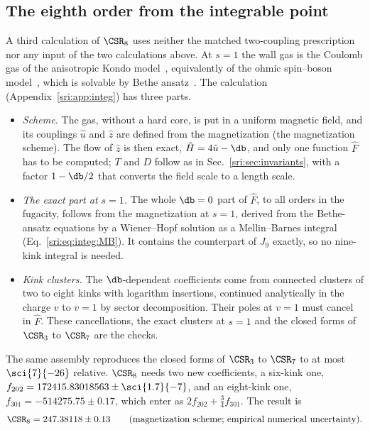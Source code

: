 \subsection{The eighth order from the integrable point}\label{sri:sec:integ}
A third calculation of $\CSR_8$ uses neither the matched two-coupling prescription nor any input of the two
calculations above. At $s=1$ the wall gas is the Coulomb gas of the anisotropic Kondo model~\cite{sri:Anderson:1969xx,sri:Anderson:1970kyb}, equivalently of the ohmic spin--boson model~\cite{sri:Leggett:1987zz}, which is solvable by Bethe
ansatz~\cite{sri:Andrei:1983,sri:Tsvelick:1983}. The calculation (Appendix~\ref{sri:app:integ}) has three parts.
\begin{itemize}
\item \emph{Scheme.} The gas, without a hard core, is put in a uniform magnetic field, and its couplings $\hat u$ and
 $\hat z$ are defined from the magnetization (the magnetization scheme). The flow of $\hat z$ is then exact,
 $\hat H=4\hat u-\db$, and only one function $\hat F$ has to be computed; $T$ and $D$ follow as in
 Sec.~\ref{sri:sec:invariants}, with a factor $1-\db/2$ that converts the field scale to a length scale.
\item \emph{The exact part at $s=1$.} The whole $\db=0$ part of $\hat F$, to all orders in the fugacity, follows from
 the magnetization at $s=1$, derived from the Bethe-ansatz equations by a Wiener--Hopf solution as a Mellin--Barnes
 integral (Eq.~\eqref{sri:eq:integ:MB}). It contains the counterpart of $J_9$ exactly, so no nine-kink integral is needed.
\item \emph{Kink clusters.} The $\db$-dependent coefficients come from connected clusters of two to eight kinks with
 logarithm insertions, continued analytically in the charge $v$ to $v=1$ by sector decomposition. Their poles at $v=1$
 must cancel in $\hat F$. These cancellations, the exact clusters at $s=1$ and the closed forms of $\CSR_3$ to $\CSR_7$
 are the checks.
\end{itemize}
The same assembly reproduces the closed forms of $\CSR_3$ to $\CSR_7$ to at most $\sci{7}{-26}$ relative. $\CSR_8$ needs
two new coefficients, a six-kink one, $f_{202}=172415.83018563\pm\sci{1.7}{-7}$, and an eight-kink one,
$f_{301}=-514275.75\pm0.17$, which enter as $2f_{202}+\frac34f_{301}$. The result is
\begin{equation}
 \CSR_8=247.38118\pm0.13\qquad(\text{magnetization scheme; empirical numerical uncertainty}).
 \label{sri:eq:C8integ}
\end{equation}
